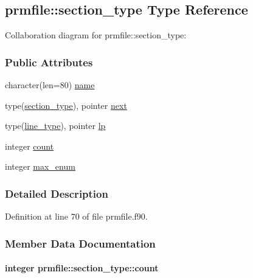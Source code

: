 \hypertarget{structprmfile_1_1section__type}{\subsection{prmfile\-:\-:section\-\_\-type Type Reference}
\label{structprmfile_1_1section__type}
}


Collaboration diagram for prmfile\-:\-:section\-\_\-type\-:
\subsubsection*{Public Attributes}
\begin{DoxyCompactItemize}
\item 
character(len=80) \hyperlink{structprmfile_1_1section__type_a80523b1519c9945d902931d811cf9f9f}{name}
\item 
type(\hyperlink{structprmfile_1_1section__type}{section\-\_\-type}), pointer \hyperlink{structprmfile_1_1section__type_aca037ef3cf44e2306b3b3a5c3c6bf7b1}{next}
\item 
type(\hyperlink{structprmfile_1_1line__type}{line\-\_\-type}), pointer \hyperlink{structprmfile_1_1section__type_a6d9c8a02c4c1e430dcc10811b98afe05}{lp}
\item 
integer \hyperlink{structprmfile_1_1section__type_a1756e9d039afc95ca61fcc8cf6fd7956}{count}
\item 
integer \hyperlink{structprmfile_1_1section__type_a7d9718bffe5edcc1168071b146462dc0}{max\-\_\-enum}
\end{DoxyCompactItemize}


\subsubsection{Detailed Description}


Definition at line 70 of file prmfile.\-f90.



\subsubsection{Member Data Documentation}
\hypertarget{structprmfile_1_1section__type_a1756e9d039afc95ca61fcc8cf6fd7956}{
\paragraph[{count}]{\setlength{\rightskip}{0pt plus 5cm}integer prmfile\-::section\-\_\-type\-::count}}\label{structprmfile_1_1section__type_a1756e9d039afc95ca61fcc8cf6fd7956}


